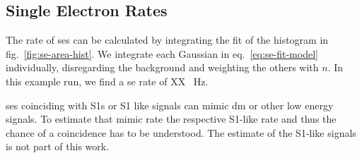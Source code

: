 
\FloatBarrier
\subsection{Single Electron Rates}
\label{ssec:rate}
\FloatBarrier


The rate of \glspl{se} can be calculated by integrating the fit of the histogram in fig.~\ref{fig:se-area-hist}.
We integrate each Gaussian in eq.~\ref{eq:se-fit-model} individually, disregarding the background and weighting the others with $ n $.
In this example run, we find a \gls{se} rate of XX \SI{}{\hertz}.

\glspl{se} coinciding with S1s or S1 like signals can mimic \gls{dm} or other low energy signals.
To estimate that mimic rate the respective S1-like rate and thus the chance of a coincidence has to be understood.
The estimate of the S1-like signals is not part of this work.







